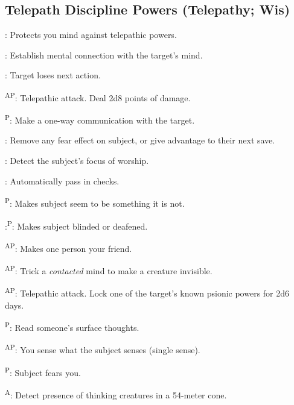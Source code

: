 \subsection{Telepath Discipline Powers {\normalsize(Telepathy; Wis)}}
\begin{enumerate*}
\item {}: Protects you mind against telepathic powers.

      : Establish mental connection with the target's mind.

      : Target loses next action.

      \textsuperscript{AP}: Telepathic attack. Deal 2d8 points of damage.

      \textsuperscript{P}: Make a one-way communication with the target.

      : Remove any fear effect on subject, or give advantage to their next save.

      : Detect the subject's focus of worship.

      : Automatically pass in  checks.

\item {}\textsuperscript{P}: Makes subject seem to be something it is not.

      :\textsuperscript{P}: Makes subject blinded or deafened.

      \textsuperscript{AP}: Makes one person your friend.

      \textsuperscript{AP}: Trick a \emph{contacted} mind to make a creature invisible.

      \textsuperscript{AP}: Telepathic attack. Lock one of the target's known psionic powers for 2d6 days.

      \textsuperscript{P}: Read someone's surface thoughts.

      \textsuperscript{AP}: You sense what the subject senses (single sense).

\item {}\textsuperscript{P}: Subject fears you.

      \textsuperscript{A}: Detect presence of thinking creatures in a 54-meter cone.


\end{enumerate*}

